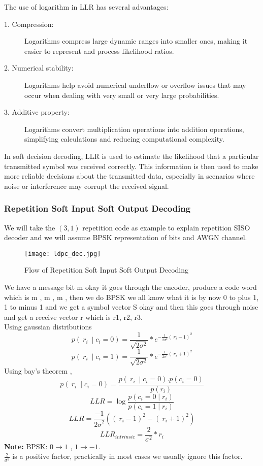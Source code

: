 The use of logarithm in LLR has several advantages:
\begin{description}
    \item[1. Compression:] Logarithms compress large dynamic ranges into smaller ones, making it easier to represent and process likelihood ratios.
    \item[2. Numerical stability:] Logarithms help avoid numerical underflow or overflow issues that may occur when dealing with very small or very large probabilities.
    \item[3. Additive property:] Logarithms convert multiplication operations into addition operations, simplifying calculations and reducing computational complexity. 
\end{description}
In soft decision decoding, LLR is used to estimate the likelihood that a particular transmitted symbol was received correctly. This information is then used to make more reliable decisions about the transmitted data, especially in scenarios where noise or interference may corrupt the received signal.

\subsubsection{Repetition Soft Input Soft Output Decoding}
We will take the $(3, 1)$ repetition code as example to explain repetition SISO decoder and we will assume BPSK representation of bits and AWGN channel.
\begin{figure}[h]
    \centering
    \texttt{[image: ldpc\_dec.jpg]}
    \caption{Flow of Repetition Soft Input Soft Output Decoding}
    \label{fig:flow of LDPC RSISOD}
\end{figure}
We have a message bit m okay it goes through the encoder, produce a code word which is m , m , m  , then we do BPSK we all know what it is by now 0 to plus 1, 1 to  minus 1 and we get a symbol vector S okay and then this goes through noise and get a receive vector r which is r1, r2, r3.\\
Using gaussian distributions
\[ p\left({\ r}_i\ \middle| c_i=0\right)=\frac{1}{\sqrt{2\sigma^2}}\ast e^{{-\frac{1}{{2\sigma}^2}({\ r}_i-1)}^2} \]
\[ p\left({\ r}_i\ \middle| c_i=1\right)=\frac{1}{\sqrt{2\sigma^2}}\ast e^{{-\frac{1}{{2\sigma}^2}({\ r}_i+1)}^2} \]
Using bay's theorem ,
\[p\left({\ r}_i\ \middle| c_i=0\right)=\frac{p\left({\ r}_i\ \middle| c_i=0\right).p(c_i=0)}{p(r_i)}\]
\[LLR=\log\frac{p\left(c_i=0\middle| r_i\right)}{p\left(c_i=1\middle| r_i\right)}\]
\[LLR=\frac{-1}{{2\sigma}^2}\left(\left(\ r_i-1\right)^2-\left(\ r_i+1\right)^2\right)\]
\[{LLR}_{intrinsic}= \frac{2}{\sigma^2} \ast r_i\]
\textbf{Note:} BPSK: $0 \rightarrow 1$ , $1 \rightarrow -1$.\\
$\frac{2}{\sigma^2}$ is a positive factor, practically in most cases we usually ignore this factor.\\

